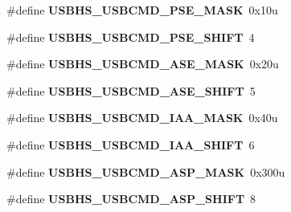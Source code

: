 \begin{DoxyCompactItemize}
\item 
\hypertarget{group___u_s_b_h_s___register___masks_ga4b55ff7ac4c950e692c2df15936b7d38}{}\#define {\bfseries U\+S\+B\+H\+S\+\_\+\+U\+S\+B\+C\+M\+D\+\_\+\+P\+S\+E\+\_\+\+M\+A\+S\+K}~0x10u\label{group___u_s_b_h_s___register___masks_ga4b55ff7ac4c950e692c2df15936b7d38}

\item 
\hypertarget{group___u_s_b_h_s___register___masks_ga73b31c8be167e843d1f609770a945ad0}{}\#define {\bfseries U\+S\+B\+H\+S\+\_\+\+U\+S\+B\+C\+M\+D\+\_\+\+P\+S\+E\+\_\+\+S\+H\+I\+F\+T}~4\label{group___u_s_b_h_s___register___masks_ga73b31c8be167e843d1f609770a945ad0}

\item 
\hypertarget{group___u_s_b_h_s___register___masks_gab0b0c8fa996660c4380c36317f86451f}{}\#define {\bfseries U\+S\+B\+H\+S\+\_\+\+U\+S\+B\+C\+M\+D\+\_\+\+A\+S\+E\+\_\+\+M\+A\+S\+K}~0x20u\label{group___u_s_b_h_s___register___masks_gab0b0c8fa996660c4380c36317f86451f}

\item 
\hypertarget{group___u_s_b_h_s___register___masks_gaf67812af4f191d7abdc9ea99be497de4}{}\#define {\bfseries U\+S\+B\+H\+S\+\_\+\+U\+S\+B\+C\+M\+D\+\_\+\+A\+S\+E\+\_\+\+S\+H\+I\+F\+T}~5\label{group___u_s_b_h_s___register___masks_gaf67812af4f191d7abdc9ea99be497de4}

\item 
\hypertarget{group___u_s_b_h_s___register___masks_gafdfcc246cab01096001faf375b48f1bc}{}\#define {\bfseries U\+S\+B\+H\+S\+\_\+\+U\+S\+B\+C\+M\+D\+\_\+\+I\+A\+A\+\_\+\+M\+A\+S\+K}~0x40u\label{group___u_s_b_h_s___register___masks_gafdfcc246cab01096001faf375b48f1bc}

\item 
\hypertarget{group___u_s_b_h_s___register___masks_ga7aab09e488b66f918014bdcb1ba3c476}{}\#define {\bfseries U\+S\+B\+H\+S\+\_\+\+U\+S\+B\+C\+M\+D\+\_\+\+I\+A\+A\+\_\+\+S\+H\+I\+F\+T}~6\label{group___u_s_b_h_s___register___masks_ga7aab09e488b66f918014bdcb1ba3c476}

\item 
\hypertarget{group___u_s_b_h_s___register___masks_gabcf83273eb37bbc86a12347ec70e2872}{}\#define {\bfseries U\+S\+B\+H\+S\+\_\+\+U\+S\+B\+C\+M\+D\+\_\+\+A\+S\+P\+\_\+\+M\+A\+S\+K}~0x300u\label{group___u_s_b_h_s___register___masks_gabcf83273eb37bbc86a12347ec70e2872}

\item 
\hypertarget{group___u_s_b_h_s___register___masks_ga4272b4961d1ce73597bd859900deaccb}{}\#define {\bfseries U\+S\+B\+H\+S\+\_\+\+U\+S\+B\+C\+M\+D\+\_\+\+A\+S\+P\+\_\+\+S\+H\+I\+F\+T}~8\label{group___u_s_b_h_s___register___masks_ga4272b4961d1ce73597bd859900deaccb}


\end{DoxyCompactItemize}
